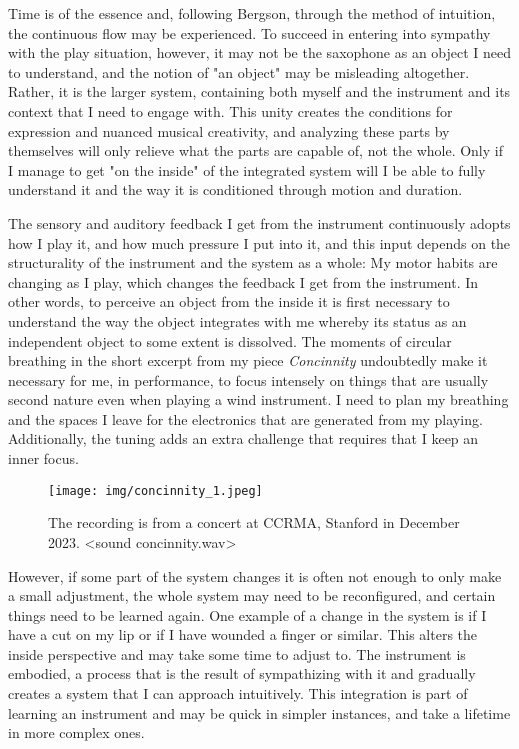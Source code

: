 \documentclass[11pt]{article}
\begin{document}
Time is of the essence and, following Bergson, through the method of intuition, the continuous flow may be experienced.
To succeed in entering into sympathy with the play situation, however, it may not be the saxophone as an object I need to understand, and the notion of "an object" may be misleading altogether.
Rather, it is the larger system, containing both myself and the instrument and its context that I need to engage with.
This unity creates the conditions for expression and nuanced musical creativity, and analyzing these parts by themselves will only relieve what the parts are capable of, not the whole.
Only if I manage to get "on the inside" of the integrated system will I be able to fully understand it and the way it is conditioned through motion and duration.

The sensory and auditory feedback I get from the instrument continuously adopts how I play it, and how much pressure I put into it, and this input depends on the structurality of the instrument and the system as a whole: My motor habits are changing as I play, which changes the feedback I get from the instrument.
In other words, to perceive an object from the inside it is first necessary to understand the way the object integrates with me whereby its status as an independent object to some extent is dissolved.
The moments of circular breathing in the short excerpt from my piece \emph{Concinnity} undoubtedly make it necessary for me, in performance, to focus intensely on things that are usually second nature even when playing a wind instrument.
I need to plan my breathing and the spaces I leave for the electronics that are generated from my playing. Additionally, the tuning adds an extra challenge that requires that I keep an inner focus.

\begin{figure}[htbp]
\centering
\texttt{[image: img/concinnity\_1.jpeg]}
\caption{\label{fig:org5046a03}The recording is from a concert at CCRMA, Stanford in December 2023. <sound concinnity.wav>}
\end{figure}

However, if some part of the system changes it is often not enough to only make a small adjustment, the whole system may need to be reconfigured, and certain things need to be learned again.
One example of a change in the system is if I have a cut on my lip or if I have wounded a finger or similar.
This alters the inside perspective and may take some time to adjust to.
The instrument is embodied, a process that is the result of sympathizing with it and gradually creates a system that I can approach intuitively.
This integration is part of learning an instrument and may be quick in simpler instances, and take a lifetime in more complex ones.
\end{document}
